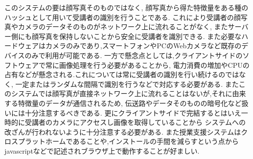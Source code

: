 \documentclass[uplatex,a4j,11pt,dvipdfmx]{jsarticle}
\begin{document}
このシステムの要は顔写真そのものではなく,
顔写真から得た特徴量をある種のハッシュとして用いて受講者の識別を行うことである.
これにより受講者の顔写真やカメラのデータそのものがネットワーク上に流れることがなく,
またサーバー側にも顔写真を保持しないことから安全に受講者を識別できる.
また必要なハードウェアはカメラのみであり,スマートフォンやPCのWebカメラなど既存のデバイスのみで利用が可能である.
一方で懸念点としては,クライアントサイドのソフトウェアで常に画像処理を行う必要があることから,
電力消費の増加やCPUの占有などが懸念される.これについては常に受講者の識別を行い続けるのではなく,
一定またはランダムな間隔で識別を行うなどで対応する必要がある.
またこのシステムでは顔写真が直接ネットワーク上に流れることはないが,それに由来する特徴量のデータが通信されるため,
伝送路やデータそのものの暗号化など扱いには十分注意するべきである.
更にクライアントサイドで完結するとはいえ一時的に受講者のカメラにアクセスし画像を取得していることから
システムへの改ざんが行われないように十分注意する必要がある.
また授業支援システムはクロスプラットホームであることや,インストールの手間を減らすという点から
javascriptなどで記述されブラウザ上で動作することが好ましい.

\end{document}
